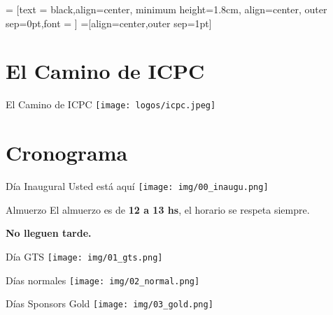 \documentclass{beamer}
\begin{document}
 = [text = black,align=center, minimum height=1.8cm, align=center, outer sep=0pt,font = \footnotesize]
 =[align=center,outer sep=1pt]

\section{El Camino de ICPC}

\begin{frame}{El Camino de ICPC}
    \centering
    \texttt{[image: logos/icpc.jpeg]}

\end{frame}

\section{Cronograma}


\begin{frame}{Día Inaugural}
    Usted está aquí
    \centering
    \texttt{[image: img/00\_inaugu.png]}
\end{frame}

\begin{frame}{Almuerzo}
    \centering
    El almuerzo es de {\bf 12 a 13 hs}, el horario se respeta siempre.
    
    {\bf No lleguen tarde.}
\end{frame}


\begin{frame}{Día GTS}
    \centering
    \texttt{[image: img/01\_gts.png]}
\end{frame}

\begin{frame}{Días normales}
    \centering
    \texttt{[image: img/02\_normal.png]}
\end{frame}


\begin{frame}{Días Sponsors Gold}
    \centering
    \texttt{[image: img/03\_gold.png]}
\end{frame}
\end{document}
